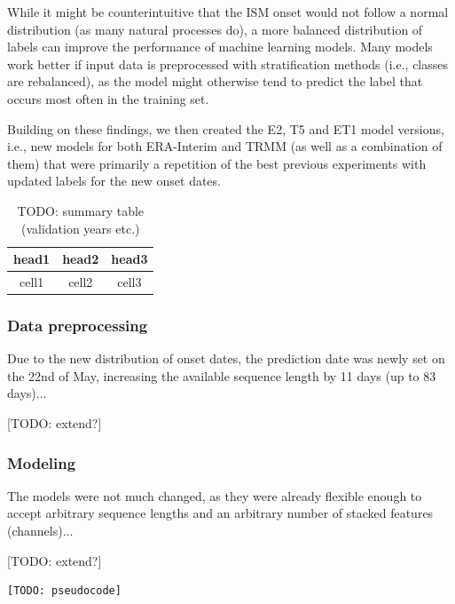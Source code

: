 While it might be counterintuitive that the ISM onset would not follow a normal distribution (as many natural processes do), a more balanced distribution of labels can improve the performance of machine learning models. Many models work better if input data is preprocessed with stratification methods (i.e., classes are rebalanced), as the model might otherwise tend to predict the label that occurs most often in the training set.

Building on these findings, we then created the E2, T5 and ET1 model versions, i.e., new models for both ERA-Interim and TRMM (as well as a combination of them) that were primarily a repetition of the best previous experiments with updated labels for the new onset dates.

\begin{table}[h]
  \centering
  \begin{tabular}{ |c|c|c| }
    \hline
    head1 & head2 & head3 \\
    \hline
    cell1 & cell2 & cell3 \\
    \hline
  \end{tabular}
  \caption{TODO: summary table (validation years etc.)}
  \label{tab:nn_e2t5_summary}
\end{table}

\subsubsection{Data preprocessing}
\label{ssst:nn_e2t5_data}
Due to the new distribution of onset dates, the prediction date was newly set on the 22nd of May, increasing the available sequence length by 11 days (up to 83 days)...

[TODO: extend?]

\subsubsection{Modeling}
\label{ssst:nn_e2t5_modeling}
The models were not much changed, as they were already flexible enough to accept arbitrary sequence lengths and an arbitrary number of stacked features (channels)...

[TODO: extend?]

\begin{figure}[h]
\end{figure}

\begin{lstlisting}[language=Python]
  [TODO: pseudocode]
\end{lstlisting}

